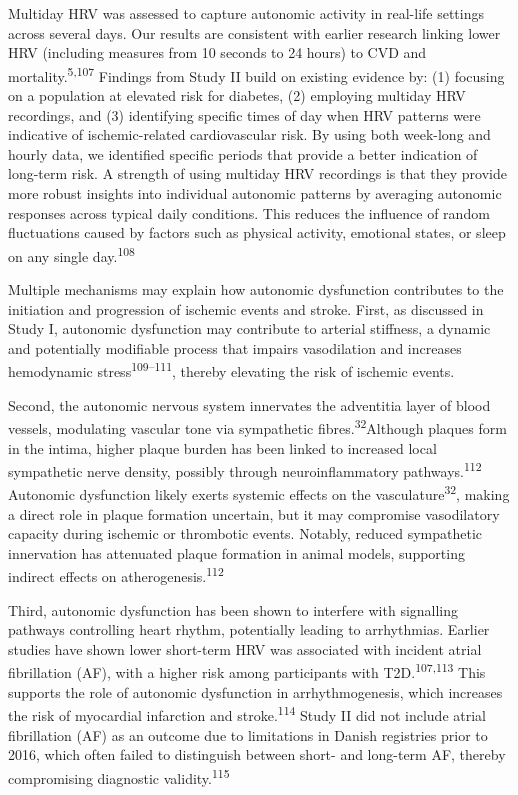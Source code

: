 \documentclass[
  letterpaper,
  headsepline=true,
  open=any]{scrbook}
\begin{document}
Multiday HRV was assessed to capture autonomic activity in real-life
settings across several days. Our results are consistent with earlier
research linking lower HRV (including measures from 10 seconds to 24
hours) to CVD and mortality.\textsuperscript{5,107} Findings from Study
II build on existing evidence by: (1) focusing on a population at
elevated risk for diabetes, (2) employing multiday HRV recordings, and
(3) identifying specific times of day when HRV patterns were indicative
of ischemic-related cardiovascular risk. By using both week-long and
hourly data, we identified specific periods that provide a better
indication of long-term risk. A strength of using multiday HRV
recordings is that they provide more robust insights into individual
autonomic patterns by averaging autonomic responses across typical daily
conditions. This reduces the influence of random fluctuations caused by
factors such as physical activity, emotional states, or sleep on any
single day.\textsuperscript{108}

Multiple mechanisms may explain how autonomic dysfunction contributes to
the initiation and progression of ischemic events and stroke. First, as
discussed in Study I, autonomic dysfunction may contribute to arterial
stiffness, a dynamic and potentially modifiable process that impairs
vasodilation and increases hemodynamic stress\textsuperscript{109--111},
thereby elevating the risk of ischemic events.

Second, the autonomic nervous system innervates the adventitia layer of
blood vessels, modulating vascular tone via sympathetic
fibres.\textsuperscript{32}Although plaques form in the intima, higher
plaque burden has been linked to increased local sympathetic nerve
density, possibly through neuroinflammatory
pathways.\textsuperscript{112} Autonomic dysfunction likely exerts
systemic effects on the vasculature\textsuperscript{32}, making a direct
role in plaque formation uncertain, but it may compromise vasodilatory
capacity during ischemic or thrombotic events. Notably, reduced
sympathetic innervation has attenuated plaque formation in animal
models, supporting indirect effects on
atherogenesis.\textsuperscript{112}

Third, autonomic dysfunction has been shown to interfere with signalling
pathways controlling heart rhythm, potentially leading to arrhythmias.
Earlier studies have shown lower short-term HRV was associated with
incident atrial fibrillation (AF), with a higher risk among participants
with T2D.\textsuperscript{107,113} This supports the role of autonomic
dysfunction in arrhythmogenesis, which increases the risk of myocardial
infarction and stroke.\textsuperscript{114} Study II did not include
atrial fibrillation (AF) as an outcome due to limitations in Danish
registries prior to 2016, which often failed to distinguish between
short- and long-term AF, thereby compromising diagnostic
validity.\textsuperscript{115}
\end{document}
